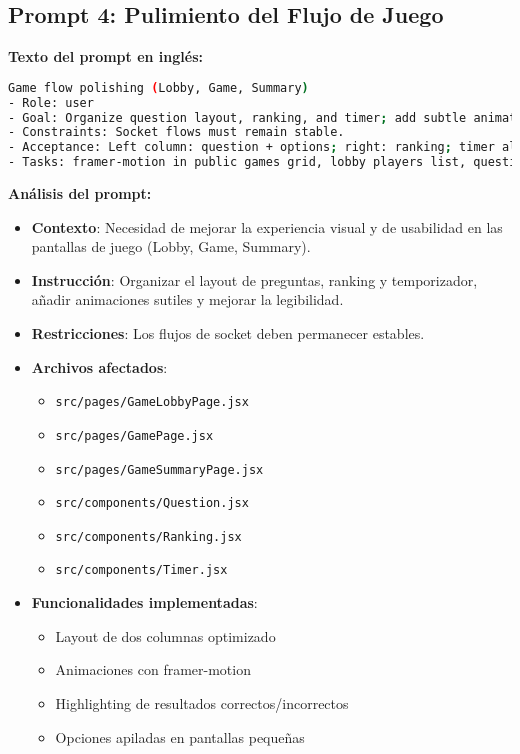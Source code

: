 \documentclass[12pt,a4paper]{article}
\begin{document}
\subsection{Prompt 4: Pulimiento del Flujo de Juego}

\textbf{Texto del prompt en inglés:}
\begin{lstlisting}[language=bash]
Game flow polishing (Lobby, Game, Summary)
- Role: user
- Goal: Organize question layout, ranking, and timer; add subtle animations; improve readability.
- Constraints: Socket flows must remain stable.
- Acceptance: Left column: question + options; right: ranking; timer aligned; animations for lists and options; stacked options on small screens.
- Tasks: framer-motion in public games grid, lobby players list, question options; two-column options on `sm:`; result highlighting (correct/incorrect).
\end{lstlisting}

\textbf{Análisis del prompt:}
\begin{itemize}
    \item \textbf{Contexto}: Necesidad de mejorar la experiencia visual y de usabilidad en las pantallas de juego (Lobby, Game, Summary).
    
    \item \textbf{Instrucción}: Organizar el layout de preguntas, ranking y temporizador, añadir animaciones sutiles y mejorar la legibilidad.
    
    \item \textbf{Restricciones}: Los flujos de socket deben permanecer estables.
    
    \item \textbf{Archivos afectados}:
    \begin{itemize}
        \item \texttt{src/pages/GameLobbyPage.jsx}
        \item \texttt{src/pages/GamePage.jsx}
        \item \texttt{src/pages/GameSummaryPage.jsx}
        \item \texttt{src/components/Question.jsx}
        \item \texttt{src/components/Ranking.jsx}
        \item \texttt{src/components/Timer.jsx}
    \end{itemize}
    
    \item \textbf{Funcionalidades implementadas}:
    \begin{itemize}
        \item Layout de dos columnas optimizado
        \item Animaciones con framer-motion
        \item Highlighting de resultados correctos/incorrectos
        \item Opciones apiladas en pantallas pequeñas
    \end{itemize}
\end{itemize}
\end{document}
